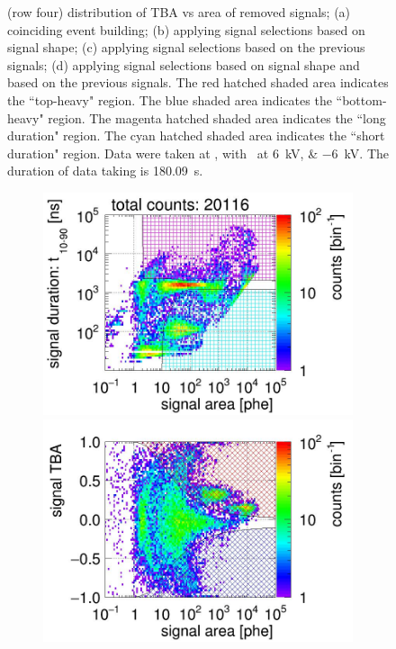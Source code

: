 \begin{landscape}
\begin{figure}[!p]
{(row four) distribution of TBA vs area of removed signals;
			(a) coinciding event building; 
			(b) applying signal selections based on signal shape;
			(c) applying signal selections based on the previous signals;
			(d) applying signal selections based on signal shape and based on the previous signals.
		The red hatched shaded area indicates the ``top-heavy" region.
	The blue shaded area indicates the ``bottom-heavy" region.
	The magenta hatched shaded area indicates the ``long duration" region.
The cyan hatched shaded area indicates the ``short duration" region.
Data were taken at , with \opvtvb\ at \SIlist{+6;-6}{kV}. The duration of data taking is \SI{180.09}{\s}.
		}
		\label{fig:signal selection dv 12}
	\end{figure}
\end{landscape}
\begin{landscape}%
	\begin{figure}[!p]
		\centering
		\begin{subfigure}[t]{0.32\textwidth} %
			\centering
			\includegraphics[width=\figurewidth,clip,trim={0 98 0 15}]{Figures/GasTest/CutsValid/res64769/pdpa22Vecfig64769.jpg}
			\includegraphics[width=\figurewidth,clip,trim={0 8 0 40}]{Figures/GasTest/CutsValid/res64769/tbapa22Vecfig64769.jpg}

\end{subfigure}
\end{figure}
\end{landscape}
